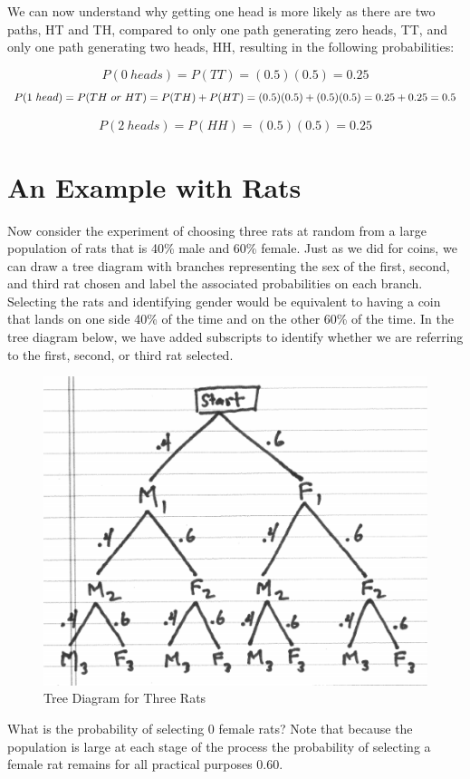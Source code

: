 \documentclass[]{book}
\theoremstyle{definition}
\theoremstyle{definition}
\theoremstyle{definition}
\theoremstyle{remark}
\begin{document}
We can now understand why getting one head is more likely as there are
two paths, HT and TH, compared to only one path generating zero heads,
TT, and only one path generating two heads, HH, resulting in the
following probabilities:

\[P(0\ heads) = P(TT) = (0.5)(0.5) = 0.25\]
\[\small P(1\ head) = P(TH\ or\ HT) = P(TH) + P(HT) = (0.5)(0.5) + (0.5)(0.5) = 0.25 + 0.25 = 0.5\]

\[P(2\ heads) = P(HH) = (0.5)(0.5) = 0.25\]

\section{An Example with Rats}\label{an_example_with_rats}

Now consider the experiment of choosing three rats at random from a
large population of rats that is 40\% male and 60\% female. Just as we
did for coins, we can draw a tree diagram with branches representing the
sex of the first, second, and third rat chosen and label the associated
probabilities on each branch. Selecting the rats and identifying gender
would be equivalent to having a coin that lands on one side 40\% of the
time and on the other 60\% of the time. In the tree diagram below, we
have added subscripts to identify whether we are referring to the first,
second, or third rat selected.

\begin{figure}

{\centering \includegraphics[width=0.6\linewidth]{01-basics-figures/tree_rat_sex} 

}

\caption{Tree Diagram for Three Rats}\label{fig:nice-fig-35}
\end{figure}

What is the probability of selecting 0 female rats? Note that because
the population is large at each stage of the process the probability of
selecting a female rat remains for all practical purposes 0.60.
\end{document}
